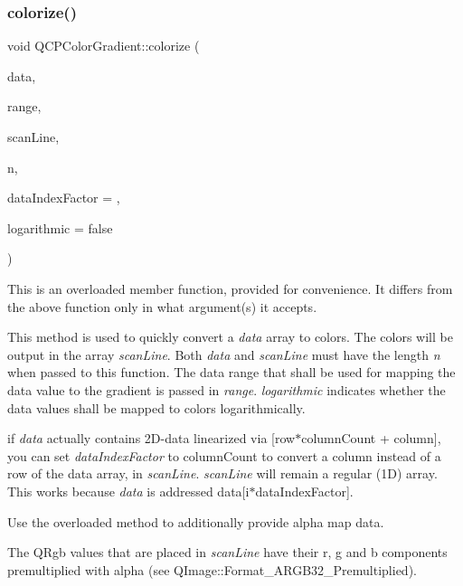 \subsubsection{\texorpdfstring{colorize()}{colorize()}\hspace{0.1cm}{\footnotesize\ttfamily [1/2]}}
{\footnotesize\ttfamily void Q\+C\+P\+Color\+Gradient\+::colorize (\begin{DoxyParamCaption}\item[{const double $\ast$}]{data,  }\item[{const \hyperlink{class_q_c_p_range}{Q\+C\+P\+Range} \&}]{range,  }\item[{Q\+Rgb $\ast$}]{scan\+Line,  }\item[{int}]{n,  }\item[{int}]{data\+Index\+Factor = {},  }\item[{bool}]{logarithmic = {\ttfamily false} }\end{DoxyParamCaption})}

This is an overloaded member function, provided for convenience. It differs from the above function only in what argument(s) it accepts.

This method is used to quickly convert a {\itshape data} array to colors. The colors will be output in the array {\itshape scan\+Line}. Both {\itshape data} and {\itshape scan\+Line} must have the length {\itshape n} when passed to this function. The data range that shall be used for mapping the data value to the gradient is passed in {\itshape range}. {\itshape logarithmic} indicates whether the data values shall be mapped to colors logarithmically.

if {\itshape data} actually contains 2\+D-\/data linearized via {\ttfamily \mbox{[}row$\ast$column\+Count + column\mbox{]}}, you can set {\itshape data\+Index\+Factor} to {\ttfamily column\+Count} to convert a column instead of a row of the data array, in {\itshape scan\+Line}. {\itshape scan\+Line} will remain a regular (1D) array. This works because {\itshape data} is addressed {\ttfamily data\mbox{[}i$\ast$data\+Index\+Factor\mbox{]}}.

Use the overloaded method to additionally provide alpha map data.

The Q\+Rgb values that are placed in {\itshape scan\+Line} have their r, g and b components premultiplied with alpha (see Q\+Image\+::\+Format\+\_\+\+A\+R\+G\+B32\+\_\+\+Premultiplied). \mbox{\label{class_q_c_p_color_gradient_acf0cc7fba83ef21f7b8d5d5258519db3}} 
